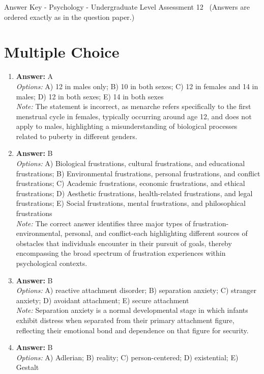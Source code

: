 \documentclass[12pt]{article}
\begin{document}
\begin{center}
Answer Key - Psychology - Undergraduate Level Assessment 12 \
\small (Answers are ordered exactly as in the question paper.)
\end{center}

\section*{Multiple Choice}
\begin{enumerate}[label=\arabic*.]
\item \textbf{Answer:} A
\\ \textit{Options:} A) 12 in males only; B) 10 in both sexes; C) 12 in females and 14 in males; D) 12 in both sexes; E) 14 in both sexes
\\ \textit{Note:} The statement is incorrect, as menarche refers specifically to the first menstrual cycle in females, typically occurring around age 12, and does not apply to males, highlighting a misunderstanding of biological processes related to puberty in different genders.
\item \textbf{Answer:} B
\\ \textit{Options:} A) Biological frustrations, cultural frustrations, and educational frustrations; B) Environmental frustrations, personal frustrations, and conflict frustrations; C) Academic frustrations, economic frustrations, and ethical frustrations; D) Aesthetic frustrations, health-related frustrations, and legal frustrations; E) Social frustrations, mental frustrations, and philosophical frustrations
\\ \textit{Note:} The correct answer identifies three major types of frustration-environmental, personal, and conflict-each highlighting different sources of obstacles that individuals encounter in their pursuit of goals, thereby encompassing the broad spectrum of frustration experiences within psychological contexts.
\item \textbf{Answer:} B
\\ \textit{Options:} A) reactive attachment disorder; B) separation anxiety; C) stranger anxiety; D) avoidant attachment; E) secure attachment
\\ \textit{Note:} Separation anxiety is a normal developmental stage in which infants exhibit distress when separated from their primary attachment figure, reflecting their emotional bond and dependence on that figure for security.
\item \textbf{Answer:} B
\\ \textit{Options:} A) Adlerian; B) reality; C) person-centered; D) existential; E) Gestalt

\end{enumerate}
\end{document}
